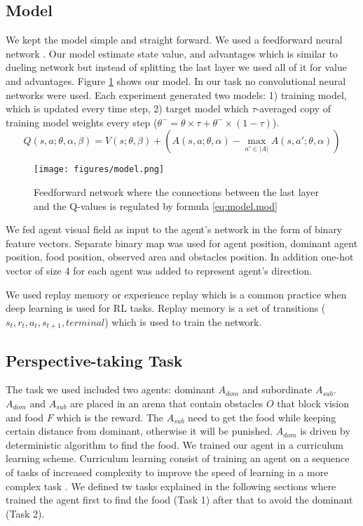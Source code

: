 \documentclass{article}
\begin{document}
\subsection{Model}
We kept the model simple and straight forward. We used a feedforward neural network \cite{Goodfellow-et-al-2016}. Our model estimate state value, and advantages which is similar to dueling network \cite{DBLP:journals/corr/WangFL15} but instead of splitting the last layer we used all of it for value and advantages. Figure \ref{fig.model} shows our model. In our task no convolutional neural networks were used. Each experiment generated two models: 1) training model, which is updated every time step, 2) target model which $\tau$-averaged copy of training model weights every step (\(\theta^{-} = \theta \times \tau + \theta^{-} \times (1-\tau)\)).
  \begin{equation} \label{eq:model.mod}
    Q(s,a;\theta,\alpha,\beta) = V(s;\theta,\beta) +\left( A(s,a;\theta,\alpha) - \underset{a' \in |A|}{\max}A(s,a';\theta,\alpha) \right)
  \end{equation}
\begin{figure}[!ht]
\begin{center}
\texttt{[image: figures/model.png]}
\caption{Feedforward network where the connections between the last layer and the Q-values is regulated by formula \ref{eq:model.mod}}
\label{fig.model}
\end{center}
\end{figure}

 \par We fed \label{network.input} agent visual field as input to the agent's network in the form of binary feature vectors. Separate binary map was used for agent position, dominant agent position, food position, observed area and obstacles position. In addition one-hot vector of size 4 for each agent was added to represent agent's direction.

\par We used replay memory or experience replay which is a common practice when deep learning is used for RL tasks\cite{DBLP:journals/corr/WangFL15,mnih2015human,mnih2013playing}. Replay memory is a set of transitions (\(s_t,r_t,a_t,s_{t+1},terminal\)) which is used to train the network.

\subsection{Perspective-taking Task}
The task we used included two agents: dominant $A_{dom}$ and subordinate $A_{sub}$. $A_{dom}$ and $A_{sub}$ are placed in an arena that contain obstacles $O$ that block vision and food $F$ which is the reward. The $A_{sub}$  need to get the food while keeping certain distance from dominant, otherwise it will be punished. $A_{dom}$ is driven by deterministic algorithm to find the food. 
We trained our agent in a curriculum learning scheme.
Curriculum learning consist of training an agent on a sequence of tasks of increased complexity to improve the speed of learning in a more complex task \cite{narvekar2016curriculum}. We defined tw tasks explained in the following sections where trained the agent first to find the food (Task 1) after that to avoid the dominant (Task 2).
\end{document}

